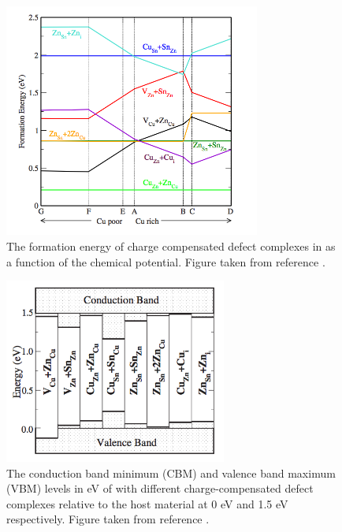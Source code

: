\begin{figure}[h!]
  \centering
    \includegraphics[width=0.75\textwidth]{figures/Chen_cluster_formE.png}
    \caption{The formation energy of charge compensated defect complexes in \CZTS as a function of the chemical potential. Figure taken from reference .}
  \label{Chen_cluster1}
\end{figure}

\begin{figure}[h!]
  \centering
    \includegraphics[width=0.65\textwidth]{figures/Chen_cluster_E-level.png}
    \caption{The conduction band minimum (CBM) and valence band maximum (VBM) levels in eV of \CZTS with different charge-compensated defect complexes relative to the host material at 0 eV and 1.5 eV respectively. Figure taken from reference . }
  \label{Chen_cluster2}
\end{figure}

